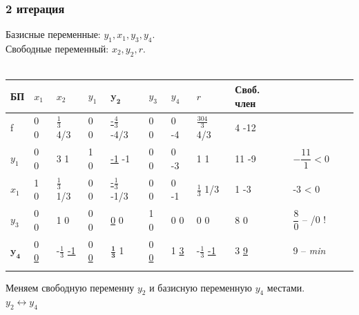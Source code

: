 \documentclass[14pt,a4paper,fleqn]{extarticle}
\begin{document}
\subsubsection*{2 итерация}
Базисные переменные: $y_1, x_1, y_3, y_4$.\\
Свободные переменный: $x_2, y_2, r$.\\\\
\begin{tabularx}{\textwidth}{|p{1cm}|p{1cm}|p{1cm}|p{1cm}V{6}p{1cm}V{6}p{1cm}|p{1cm}|p{1.2cm}|p{1.2cm}|c}
	\hline
	БП & $x_1$ & $x_2$ & $y_1$ & $\boldsymbol{y_2}$ & $y_3$ & $y_4$ & $r$ & Своб. член & \\
	\hline
	
	f & 0 \scriptsize 0 & \small $\frac{1}{3}$ \tiny 4/3 & 0 \scriptsize 0 & \underline{\small -$\frac{4}{3}$} \tiny -4/3 & 0 \scriptsize 0 & 0 \scriptsize -4 & \small $\frac{304}{3}$ \tiny 4/3 & 4 \scriptsize -12 & \\
	
	\hline
	
	$y_1$ & 0 \scriptsize 0 & 3 \scriptsize 1 & 1 \scriptsize 0 & \underline{-1} \scriptsize -1 & 0 \scriptsize 0 & 0 \scriptsize -3 & 1 \scriptsize 1 & 11 \scriptsize -9 & $-\dfrac{11}{1} < 0$ \\
	
	\hline
	
	$x_1$ & 1 \scriptsize 0 & \small $\frac{1}{3}$ \scriptsize 1/3 & 0 \scriptsize 0 & \underline{\small -$\frac{1}{3}$} \tiny -1/3 & 0 \scriptsize 0 & 0 \scriptsize -1 & \small $\frac{1}{3}$ \scriptsize 1/3 & 1 \scriptsize -3 & -3 < 0 \\
	
	\hline
	$y_3$ & 0 \scriptsize 0 & 1 \scriptsize 0 & 0 \scriptsize 0 & \underline 0 \scriptsize 0 & 1 \scriptsize 0 & 0 \scriptsize 0 & 0 \scriptsize 0 & 8 \scriptsize 0 & $\dfrac{8}{0}$ -- /0 ! \\
	
	\Xhline{7\arrayrulewidth}
	$\boldsymbol{y_4}$ & 0 \underline{\scriptsize 0} & \small -$\frac{1}{3}$ \underline{\scriptsize -1} & 0 \underline{\scriptsize 0} & \small $\boldsymbol{\frac{1}{3}}$ \scriptsize 1 & 0 \underline{\scriptsize 0} & 1 \scriptsize \underline 3 & \small -$\frac{1}{3}$ \underline{\scriptsize -1} & 3 \underline{\scriptsize 9} & 9 -- \textit{min} \\
	\Xhline{6\arrayrulewidth}
\end{tabularx}
\newline\newline
Меняем свободную переменну $y_2$ и базисную переменную $y_4$ местами.\\
$y_2 \leftrightarrow y_4$
\newpage
\end{document}
